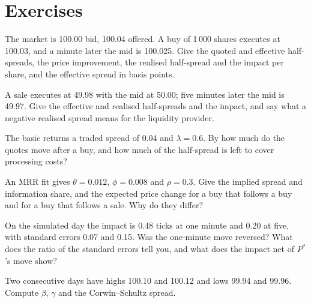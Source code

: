 \section{Exercises}

\begin{exercise}[$\star$]\label{exo:mx:decomposing-the-spread:1}
The market is 100.00 bid, 100.04 offered. A buy of 1\,000 shares executes at 100.03, and a minute later the mid is 100.025. Give the quoted and effective
half-spreads, the price improvement, the realised half-spread and the impact per share, and the effective spread in basis points.
\end{exercise}

\begin{exercise}[$\star$]\label{exo:mx:decomposing-the-spread:2}
A sale executes at 49.98 with the mid at 50.00; five minutes later the mid is 49.97. Give the effective and realised half-spreads and the impact, and say
what a negative realised spread means for the liquidity provider.
\end{exercise}

\begin{exercise}[$\star$]\label{exo:mx:decomposing-the-spread:3}
The basic  returns a traded spread of 0.04 and $\lambda=0.6$. By how much do the quotes move after a buy, and how much of the half-spread
is left to cover processing costs?
\end{exercise}

\begin{exercise}[$\star\star$]\label{exo:mx:decomposing-the-spread:4}
An MRR fit gives $\theta=0.012$, $\phi=0.008$ and $\rho=0.3$. Give the implied spread and information share, and the expected price change for a buy that
follows a buy and for a buy that follows a sale. Why do they differ?
\end{exercise}

\begin{exercise}[$\star\star$]\label{exo:mx:decomposing-the-spread:5}
On the simulated day the impact is 0.48 ticks at one minute and 0.20 at five, with standard errors 0.07 and 0.15. Was the one-minute move reversed? What
does the ratio of the standard errors tell you, and what does the impact net of $P^\ast$'s move show?
\end{exercise}

\begin{exercise}[$\star\star$]\label{exo:mx:decomposing-the-spread:6}
Two consecutive days have highs 100.10 and 100.12 and lows 99.94 and 99.96. Compute $\beta$, $\gamma$ and the Corwin--Schultz spread.
\end{exercise}

